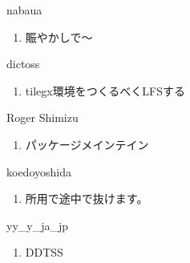 \begin{prework}{ nabaua }
  \begin{enumerate}
  \item 賑やかしで～
  \end{enumerate}
\end{prework}

\begin{prework}{ dictoss }
  \begin{enumerate}
  \item tilegx環境をつくるべくLFSする
  \end{enumerate}
\end{prework}

\begin{prework}{ Roger Shimizu }
  \begin{enumerate}
  \item パッケージメインテイン
  \end{enumerate}
\end{prework}

\begin{prework}{ koedoyoshida }
  \begin{enumerate}
  \item 所用で途中で抜けます。
  \end{enumerate}
\end{prework}

\begin{prework}{ yy\_y\_ja\_jp }
  \begin{enumerate}
  \item DDTSS
  \end{enumerate}
\end{prework}
